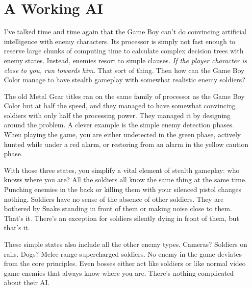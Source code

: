 \documentclass{book}
\let\oldcenter\center
\let\oldendcenter\endcenter
\renewenvironment{center}{\setlength\topsep{0pt}\oldcenter}{\oldendcenter}
\begin{document}
\FloatBarrier\needspace{10mm}\section*{A Working AI}\nopagebreak[4]

I’ve talked time and time again that the Game Boy can’t do convincing artificial intelligence with enemy characters. Its processor is simply not fast enough to reserve large chunks of computing time to calculate complex decision trees with enemy states. Instead, enemies resort to simple clauses. \emph{If the player character is close to you, run towards him}. That sort of thing. Then how can the Game Boy Color manage to have stealth gameplay with somewhat realistic enemy soldiers?

The old Metal Gear titles ran on the same family of processor as the Game Boy Color but at half the speed, and they managed to have somewhat convincing soldiers with only half the processing power. They managed it by designing around the problem. A clever example is the simple enemy detection phases. When playing the game, you are either undetected in the green phase, actively hunted while under a red alarm, or restoring from an alarm in the yellow caution phase.

\begin{center}
\vspace{8pt}
\quad\vspace{4pt}
\quad\vspace{4pt}
\end{center}

With those three states, you simplify a vital element of stealth gameplay: who knows where you are? All the soldiers all know the same thing at the same time. Punching enemies in the back or killing them with your silenced pistol changes nothing. Soldiers have no sense of the absence of other soldiers. They are bothered by Snake standing in front of them or making noise close to them. That’s it. There’s an exception for soldiers silently dying in front of them, but that’s it.

These simple states also include all the other enemy types. Cameras? Soldiers on rails. Dogs? Melee range supercharged soldiers. No enemy in the game deviates from the core principles. Even bosses either act like soldiers or like normal video game enemies that always know where you are. There’s nothing complicated about their AI.
\end{document}
